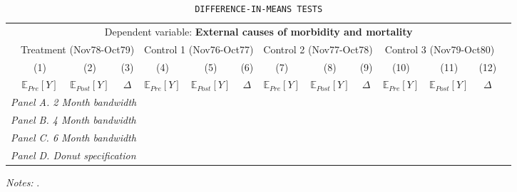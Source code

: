  \begin{table}[H] \begin{threeparttable} \centering \caption{\texttt{DIFFERENCE-IN-MEANS TESTS}} {\def\sym#1{\ifmmode^{#1}\else\(^{#1}\)\fi} \begin{tabular}{l*{13}{c}} \toprule & \multicolumn{12}{c}{Dependent variable: \textbf{External causes of morbidity and mortality}} \\ \cmidrule(lr){2-13}
            &\multicolumn{3}{c}{Treatment (Nov78-Oct79)}&\multicolumn{3}{c}{Control 1 (Nov76-Oct77)}&\multicolumn{3}{c}{Control 2 (Nov77-Oct78)}&\multicolumn{3}{c}{Control 3 (Nov79-Oct80)}\\\cmidrule(lr){2-4}\cmidrule(lr){5-7}\cmidrule(lr){8-10}\cmidrule(lr){11-13}
            &\multicolumn{1}{c}{(1)}&\multicolumn{1}{c}{(2)}&\multicolumn{1}{c}{(3)}&\multicolumn{1}{c}{(4)}&\multicolumn{1}{c}{(5)}&\multicolumn{1}{c}{(6)}&\multicolumn{1}{c}{(7)}&\multicolumn{1}{c}{(8)}&\multicolumn{1}{c}{(9)}&\multicolumn{1}{c}{(10)}&\multicolumn{1}{c}{(11)}&\multicolumn{1}{c}{(12)}\\
            &\multicolumn{1}{c}{$\mathbb{E}_{Pre}[Y]$}&\multicolumn{1}{c}{$\mathbb{E}_{Post}[Y]$}&\multicolumn{1}{c}{$\Delta$}&\multicolumn{1}{c}{$\mathbb{E}_{Pre}[Y]$}&\multicolumn{1}{c}{$\mathbb{E}_{Post}[Y]$}&\multicolumn{1}{c}{$\Delta$}&\multicolumn{1}{c}{$\mathbb{E}_{Pre}[Y]$}&\multicolumn{1}{c}{$\mathbb{E}_{Post}[Y]$}&\multicolumn{1}{c}{$\Delta$}&\multicolumn{1}{c}{$\mathbb{E}_{Pre}[Y]$}&\multicolumn{1}{c}{$\mathbb{E}_{Post}[Y]$}&\multicolumn{1}{c}{$\Delta$}\\
\midrule
 \multicolumn{13}{l}{\emph{Panel A. 2 Month bandwidth}} \\    \midrule\multicolumn{13}{l}{\emph{Panel B. 4 Month bandwidth}} \\    \midrule\multicolumn{13}{l}{\emph{Panel C. 6 Month bandwidth}} \\    \midrule\multicolumn{13}{l}{\emph{Panel D. Donut specification}} \\    
\bottomrule \end{tabular} } \begin{tablenotes} \item \scriptsize \emph{Notes:} . \end{tablenotes} \end{threeparttable} \end{table} 
